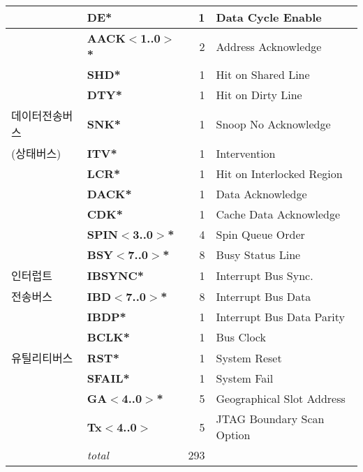 \begin{table}[htbp]
\begin{center}
\begin{tabular}{|l|l|r|l|}
         & {\bf DE*}                       & 1 & Data Cycle Enable \\ \hline
        & {\bf AACK$<$1..0$>$*}   & 2 & Address Acknowledge \\
        & {\bf SHD*}                      & 1 & Hit on Shared Line \\
        & {\bf DTY*}                      & 1 & Hit on Dirty Line \\
데이터전송버스 & {\bf SNK*}                      & 1 & Snoop No Acknowledge \\
(상태버스)  & {\bf ITV*}                      & 1 & Intervention \\
        & {\bf LCR*}                      & 1 & Hit on Interlocked Region \\
        & {\bf DACK*}                     & 1 & Data Acknowledge \\
        & {\bf CDK*}                      & 1 & Cache Data Acknowledge \\
        & {\bf SPIN$<$3..0$>$*}   & 4 & Spin Queue Order \\
        & {\bf BSY$<$7..0$>$*}    & 8 & Busy Status Line \\ \hline    
인터럽트 & {\bf IBSYNC*}                   & 1 & Interrupt Bus Sync. \\
전송버스 & {\bf IBD$<$7..0$>$*}    & 8 & Interrupt Bus Data \\
     & {\bf IBDP*}                     & 1 & Interrupt Bus Data Parity \\ \hline
       & {\bf BCLK*}                   & 1 & Bus Clock \\
유틸리티버스 & {\bf RST*}                      & 1 & System Reset \\
       & {\bf SFAIL*}                    & 1 & System Fail \\
       & {\bf GA$<$4..0$>$*}     & 5 & Geographical Slot Address \\
       & {\bf Tx$<$4..0$>$}     & 5 & JTAG Boundary Scan Option \\ \hline
       & {\it total\/} & 293 & \\
\hline
   \end{tabular}
\endgroup
   \end{center}
\end{table}
%
%

